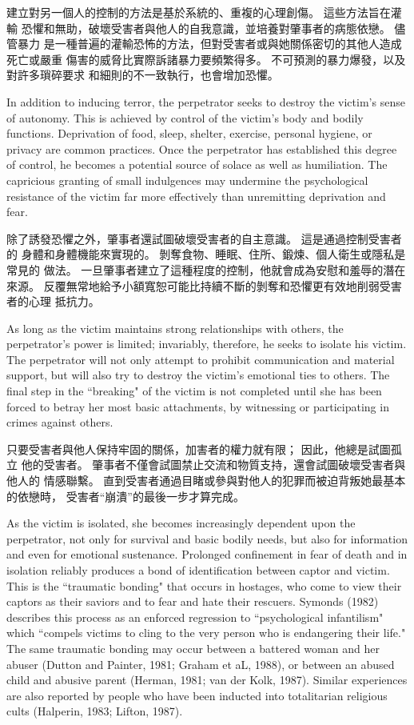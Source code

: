 \documentclass[12pt]{article}
\begin{document}
    建立對另一個人的控制的方法是基於系統的、重複的心理創傷。 這些方法旨在灌輸
    恐懼和無助，破壞受害者與他人的自我意識，並培養對肇事者的病態依戀。 儘管暴力
    是一種普遍的灌輸恐怖的方法，但對受害者或與她關係密切的其他人造成死亡或嚴重
    傷害的威脅比實際訴諸暴力要頻繁得多。 不可預測的暴力爆發，以及對許多瑣碎要求
    和細則的不一致執行，也會增加恐懼。

    In addition to inducing terror, the perpetrator seeks to destroy the
    victim's sense of autonomy. This is achieved by control of the victim's
    body and bodily functions. Deprivation of food, sleep, shelter, exercise,
    personal hygiene, or privacy are common practices. Once the perpetrator has
    established this degree of control, he becomes a potential source of solace
    as well as humiliation. The capricious granting of small indulgences may
    undermine the psychological resistance of the victim far more effectively
    than unremitting deprivation and fear.

    除了誘發恐懼之外，肇事者還試圖破壞受害者的自主意識。 這是通過控制受害者的
    身體和身體機能來實現的。 剝奪食物、睡眠、住所、鍛煉、個人衛生或隱私是常見的
    做法。 一旦肇事者建立了這種程度的控制，他就會成為安慰和羞辱的潛在來源。 
    反覆無常地給予小額寬恕可能比持續不斷的剝奪和恐懼更有效地削弱受害者的心理
    抵抗力。

    As long as the victim maintains strong relationships with others, the
    perpetrator's power is limited; invariably, therefore, he seeks to isolate
    his victim. The perpetrator will not only attempt to prohibit communication
    and material support, but will also try to destroy the victim's emotional
    ties to others. The final step in the ``breaking" of the victim is not
    completed until she has been forced to betray her most basic attachments,
    by witnessing or participating in crimes against others.

    只要受害者與他人保持牢固的關係，加害者的權力就有限； 因此，他總是試圖孤立
    他的受害者。 肇事者不僅會試圖禁止交流和物質支持，還會試圖破壞受害者與他人的
    情感聯繫。 直到受害者通過目睹或參與對他人的犯罪而被迫背叛她最基本的依戀時，
    受害者“崩潰”的最後一步才算完成。

    As the victim is isolated, she becomes increasingly dependent upon the
    perpetrator, not only for survival and basic bodily needs, but also for
    information and even for emotional sustenance. Prolonged confinement in
    fear of death and in isolation reliably produces a bond of identification
    between captor and victim. This is the ``traumatic bonding" that occurs in
    hostages, who come to view their captors as their saviors and to fear and
    hate their rescuers. Symonds (1982) describes this process as an enforced
    regression to ``psychological infantilism" which ``compels victims to cling
    to the very person who is endangering their life." The same traumatic
    bonding may occur between a battered woman and her abuser (Dutton and
    Painter, 1981; Graham et aL, 1988), or between an abused child and abusive
    parent (Herman, 1981; van der Kolk, 1987). Similar experiences are also
    reported by people who have been inducted into totalitarian religious cults
    (Halperin, 1983; Lifton, 1987).
\end{document}
